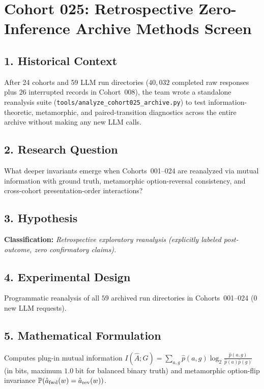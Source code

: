 \section{Cohort 025: Retrospective Zero-Inference Archive Methods Screen}

\subsection*{1. Historical Context}
After 24 cohorts and 59 LLM run directories ($40{,}032$ completed raw responses plus $26$ interrupted records in Cohort~008), the team wrote a standalone reanalysis suite (\texttt{tools/analyze\_cohort025\_archive.py}) to test information-theoretic, metamorphic, and paired-transition diagnostics across the entire archive without making any new LLM calls.

\subsection*{2. Research Question}
What deeper invariants emerge when Cohorts~001--024 are reanalyzed via mutual information with ground truth, metamorphic option-reversal consistency, and cross-cohort presentation-order interactions?

\subsection*{3. Hypothesis}
\textbf{Classification:} \emph{Retrospective exploratory reanalysis (explicitly labeled post-outcome, zero confirmatory claims).}

\subsection*{4. Experimental Design}
Programmatic reanalysis of all $59$ archived run directories in Cohorts~001--024 ($0$ new LLM requests).

\subsection*{5. Mathematical Formulation}
Computes plug-in mutual information $I(\hat{A}; G) = \sum_{a,g} \hat{p}(a,g)\log_2 \frac{\hat{p}(a,g)}{\hat{p}(a)\hat{p}(g)}$ (in bits, maximum $1.0\;\text{bit}$ for balanced binary truth) and metamorphic option-flip invariance $\mathbb{P}(\hat{a}_{\mathrm{fwd}}(w) = \hat{a}_{\mathrm{rev}}(w))$.

